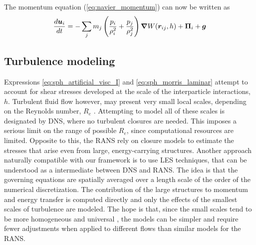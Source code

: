 The momentum equation (\eqref{eq:navier_momentum}) can now be written as
\begin{equation} \label{eq:sph_navier_momentum_I}
	\frac{{d{\boldsymbol{u}_i}}}{{dt}} = -\sum_j{m_j \left( \frac{p_i}{\rho_i^2} +\frac{p_j}{\rho_j^2} \right) \boldsymbol{\nabla} W(\boldsymbol{r}_{ij}, h)} + \boldsymbol{\Pi}_{i} + \boldsymbol{g}
\end{equation}
%


\subsection{Turbulence modeling}
\label{sec:sps}

Expressions \eqref{eq:sph_artificial_visc_I} and \eqref{eq:sph_morris_laminar} attempt to account for shear stresses developed at the scale of the interparticle interactions, $h$. Turbulent fluid flow however, may present very small local scales, depending on the Reynolds number, $R_e$ \citep{Batchelor-2000, pope-2000}. Attempting to model all of these scales is designated by \ac{DNS}, where no turbulent closures are needed. This imposes a serious limit on the range of possible $R_e$, since computational resources are limited. Opposite to this, the \ac{RANS} rely on closure models to estimate the stresses that arise even from large, energy-carrying structures. Another approach naturally compatible with our framework is to use \ac{LES} techniques, that can be understood as a intermediate between \ac{DNS} and \ac{RANS}. The idea is that the governing equations are spatially averaged over a length scale of the order of the numerical discretization. The contribution of the large structures to momentum and energy transfer is computed directly and only the effects of the smallest scales of turbulence are modeled. The hope is that, since the small scales tend to be more homogeneous and universal \citep{pope-2000}, the models can be simpler and require fewer adjustments when applied to different flows than similar models for the \ac{RANS}. 

